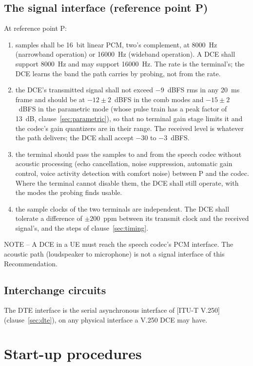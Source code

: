 \documentclass[a4paper,11pt]{article}
\newcommand{\itunote}[1]{\par{\small NOTE -- #1}\par}
\newcommand{\rec}[1]{[ITU-T #1]}
\begin{document}
\subsection{The signal interface (reference point P)}\label{sec:pointp}
At reference point P:
\begin{enumerate}[label=\alph*)]
\item samples shall be 16~bit linear PCM, two's complement, at 8000~Hz
  (narrowband operation) or 16000~Hz (wideband operation).  A DCE shall
  support 8000~Hz and may support 16000~Hz.  The rate is the terminal's;
  the DCE learns the band the path carries by probing, not from the rate.
\item the DCE's transmitted signal shall not exceed $-9$~dBFS rms in
  any 20~ms frame and should be at $-12 \pm 2$~dBFS in the comb modes
  and $-15 \pm 2$~dBFS in the parametric mode (whose pulse train has a
  peak factor of 13~dB, clause~\ref{sec:parametric}), so that no
  terminal gain stage limits it and the codec's gain quantizers are in
  their range.  The received level is whatever the path delivers;
  the DCE shall accept $-30$ to $-3$~dBFS.
\item the terminal should pass the samples to and from the speech codec
  without acoustic processing (echo cancellation, noise suppression,
  automatic gain control, voice activity detection with comfort noise)
  between P and the codec.  Where the terminal cannot disable them, the
  DCE shall still operate, with the modes the probing finds usable.
\item the sample clocks of the two terminals are independent.  The DCE
  shall tolerate a difference of $\pm 200$~ppm between its transmit clock
  and the received signal's, and the steps of clause~\ref{sec:timing}.
\end{enumerate}

\itunote{A DCE in a UE must reach the speech codec's PCM interface.  The
acoustic path (loudspeaker to microphone) is not a signal interface of
this Recommendation.}

\subsection{Interchange circuits}
The DTE interface is the serial asynchronous interface of \rec{V.250}
(clause~\ref{sec:dte}), on any physical interface a V.250 DCE may have.

\section{Start-up procedures}\label{sec:startup}
\end{document}
